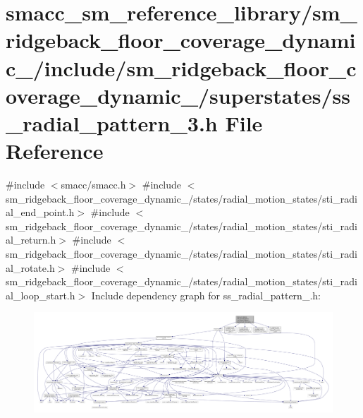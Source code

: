 \hypertarget{sm__ridgeback__floor__coverage__dynamic__1_2include_2sm__ridgeback__floor__coverage__dynamic__1_531400494dac7f71ab876c0b34344a44}{}\section{smacc\+\_\+sm\+\_\+reference\+\_\+library/sm\+\_\+ridgeback\+\_\+floor\+\_\+coverage\+\_\+dynamic\+\_/include/sm\+\_\+ridgeback\+\_\+floor\+\_\+coverage\+\_\+dynamic\+\_/superstates/ss\+\_\+radial\+\_\+pattern\+\_\+3.h File Reference}
\label{sm__ridgeback__floor__coverage__dynamic__1_2include_2sm__ridgeback__floor__coverage__dynamic__1_531400494dac7f71ab876c0b34344a44}
{\ttfamily \#include $<$smacc/smacc.\+h$>$}\newline
{\ttfamily \#include $<$sm\+\_\+ridgeback\+\_\+floor\+\_\+coverage\+\_\+dynamic\+\_/states/radial\+\_\+motion\+\_\+states/sti\+\_\+radial\+\_\+end\+\_\+point.\+h$>$}\newline
{\ttfamily \#include $<$sm\+\_\+ridgeback\+\_\+floor\+\_\+coverage\+\_\+dynamic\+\_/states/radial\+\_\+motion\+\_\+states/sti\+\_\+radial\+\_\+return.\+h$>$}\newline
{\ttfamily \#include $<$sm\+\_\+ridgeback\+\_\+floor\+\_\+coverage\+\_\+dynamic\+\_/states/radial\+\_\+motion\+\_\+states/sti\+\_\+radial\+\_\+rotate.\+h$>$}\newline
{\ttfamily \#include $<$sm\+\_\+ridgeback\+\_\+floor\+\_\+coverage\+\_\+dynamic\+\_/states/radial\+\_\+motion\+\_\+states/sti\+\_\+radial\+\_\+loop\+\_\+start.\+h$>$}\newline
Include dependency graph for ss\+\_\+radial\+\_\+pattern\+\_.\+h\+:
\nopagebreak
\begin{figure}[H]
\begin{center}
\leavevmode
\includegraphics[width=350pt]{sm__ridgeback__floor__coverage__dynamic__1_2include_2sm__ridgeback__floor__coverage__dynamic__1_3520545438111dca863ea7f697a94d99}
\end{center}
\end{figure}

